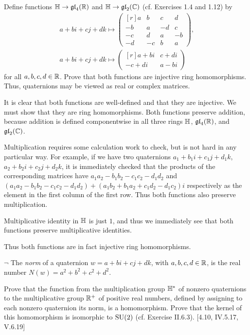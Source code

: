 \begin{problem}
	Define functions $\mathbb{H} \to \mathfrak{gl}_4(\mathbb{R})$ and $\mathbb{H} \to \mathfrak{gl}_2(\mathbb{C})$ (cf. Exercises 1.4 and 1.12) by
	\begin{gather*}
		a + bi + cj + dk \mapsto
		\begin{pmatrix*}[r]
			a & b & c & d \\
			-b & a & -d & c \\
			-c & d & a & -b \\
			-d & -c & b & a
		\end{pmatrix*} \text{,} \\
		a + bi + cj + dk \mapsto
		\begin{pmatrix*}[r]
			a + bi & c + di \\
			-c + di & a -bi
		\end{pmatrix*}
	\end{gather*}
	for all $a, b, c, d \in \mathbb{R}$. Prove that both functions are injective ring homomorphisms. Thus, quaternions may be viewed as real or complex matrices.
\end{problem}

\begin{solution}
	It is clear that both functions are well-defined and that they are injective. We must show that they are ring homomorphisms. Both functions preserve addition, because addition is defined componentwise in all three rings $\mathbb{H}$, $\mathfrak{gl}_4(\mathbb{R})$, and $\mathfrak{gl}_2(\mathbb{C})$.
	
	Multiplication requires some calculation work to check, but is not hard in any particular way. For example, if we have two quaternions $a_1 + b_1 i + c_1 j + d_1 k$, $a_2 + b_2 i + c_2 j + d_2 k$, it is immediately checked that the products of the corresponding matrices have $a_1 a_2 - b_1 b_2 - c_1 c_2 - d_1 d_2$ and $(a_1 a_2 - b_1 b_2 - c_1 c_2 - d_1 d_2) + (a_1 b_2 + b_1 a_2 + c_1 d_2 - d_1 c_2)i$ respectively as the element in the first column of the first row. Thus both functions also preserve multiplication.
	
	Multiplicative identity in $\mathbb{H}$ is just $1$, and thus we immediately see that both functions preserve multiplicative identities.
	
	Thus both functions are in fact injective ring homomorphisms.
\end{solution}

\begin{problem}
	$\neg$ The \emph{norm} of a quaternion $w = a + bi + cj + dk$, with $a, b, c, d \in \mathbb{R}$, is the real number $N(w) = a^2 + b^2 + c^2 + d^2$.
	
	Prove that the function from the multiplication group $\mathbb{H}^*$ of nonzero quaternions to the multiplicative group $\mathbb{R}^+$ of positive real numbers, defined by assigning to each nonzero quaternion its norm, is a homomorphism. Prove that the kernel of this homomorphism is isomorphic to $\mathrm{SU}(2)$ (cf. Exercise II.6.3). [4.10, IV.5.17, V.6.19]
\end{problem}

